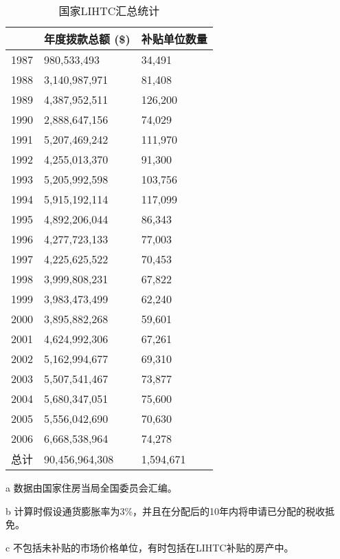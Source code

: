 \documentclass[lang=cn,11pt,a4paper]{paper}
\begin{document}
\begin{table}[h]
\centering
\setlength{\tabcolsep}{12mm}
  \begin{threeparttable}
  \caption{国家LIHTC汇总统计}\label{tab1}
    \begin{tabular}{lll}
  \toprule
  & 年度拨款总额 (\$)\tnote{b}
  & 补贴单位数量\tnote{c} \\
  \midrule
  1987 & 980,533,493 & 34,491 \\
  1988 & 3,140,987,971 & 81,408 \\
  1989 & 4,387,952,511 & 126,200 \\
  1990 & 2,888,647,156 & 74,029 \\
  1991 & 5,207,469,242 & 111,970 \\
  1992 & 4,255,013,370 & 91,300 \\
  1993 & 5,205,992,598 & 103,756 \\
  1994 & 5,915,192,114 & 117,099 \\
  1995 & 4,892,206,044 & 86,343 \\
  1996 & 4,277,723,133 & 77,003 \\
  1997 & 4,225,625,522 & 70,453 \\
  1998 & 3,999,808,231 & 67,822 \\
  1999 & 3,983,473,499 & 62,240 \\
  2000 & 3,895,882,268 & 59,601 \\
  2001 & 4,624,992,306 & 67,261 \\
  2002 & 5,162,994,677 & 69,310 \\
  2003 & 5,507,541,467 & 73,877 \\
  2004 & 5,680,347,051 & 75,600 \\
  2005 & 5,556,042,690 & 70,630 \\
  2006 & 6,668,538,964 & 74,278 \\
  总计 & 90,456,964,308 & 1,594,671 \\
  \bottomrule
    \end{tabular}
  \begin{tablenotes}
    \footnotesize
    \item[a] 数据由国家住房当局全国委员会汇编。
    \item[b] 计算时假设通货膨胀率为3\%，并且在分配后的10年内将申请已分配的税收抵免。
    \item[c] 不包括未补贴的市场价格单位，有时包括在LIHTC补贴的房产中。
  \end{tablenotes}
\end{threeparttable}
\end{table}
\end{document}
